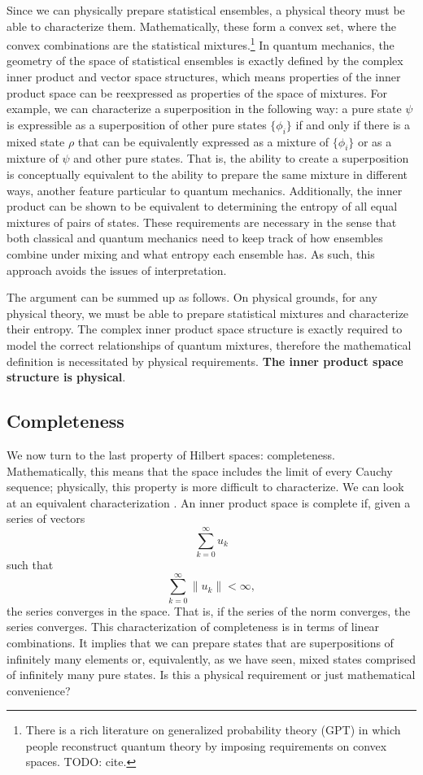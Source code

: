 \documentclass[10pt,twocolumn, nofootinbib]{revtex4-2}
\begin{document}
Since we can physically prepare statistical ensembles, a physical theory must be able to characterize them. Mathematically, these form a convex set, where the convex combinations are the statistical mixtures.\footnote{There is a rich literature on generalized probability theory (GPT) in which people reconstruct quantum theory by imposing requirements on convex spaces. TODO: cite.} In quantum mechanics, the geometry of the space of statistical ensembles is exactly defined by the complex inner product and vector space structures, which means properties of the inner product space can be reexpressed as properties of the space of mixtures. For example, we can characterize a superposition in the following way: a pure state $\psi$ is expressible as a superposition of other pure states $\{\phi_i\}$ if and only if there is a mixed state $\rho$ that can be equivalently expressed as a mixture of $\{\phi_i\}$ or as a mixture of $\psi$ and other pure states. That is, the ability to create a superposition is conceptually equivalent to the ability to prepare the same mixture in different ways, another feature particular to quantum mechanics. Additionally, the inner product can be shown to be equivalent to determining the entropy of all equal mixtures of pairs of states. These requirements are necessary in the sense that both classical and quantum mechanics need to keep track of how ensembles combine under mixing and what entropy each ensemble has. As such, this approach avoids the issues of interpretation.

The argument can be summed up as follows. On physical grounds, for any physical theory, we must be able to prepare statistical mixtures and characterize their entropy. The complex inner product space structure is exactly required to model the correct relationships of quantum mixtures, therefore the mathematical definition is necessitated by physical requirements. \textbf{The inner product space structure is physical}.

\subsection{Completeness}

We now turn to the last property of Hilbert spaces: completeness. Mathematically, this means that the space includes the limit of every Cauchy sequence; physically, this property is more difficult to characterize. We can look at an equivalent characterization \cite[Theorem 13.8, p. 330]{roman_2008}. %
An inner product space is complete if, given a series of vectors
$$ \sum _{k=0}^{\infty }u_{k}$$
such that
$$ \sum _{k=0}^{\infty }\|u_{k}\|<\infty,$$
the series converges in the space. That is, if the series of the norm converges, the series converges. This characterization of completeness is in terms of linear combinations. It implies that we can prepare states that are superpositions of infinitely many elements or, equivalently, as we have seen, mixed states comprised of infinitely many pure states. Is this a physical requirement or just mathematical convenience?
\end{document}

